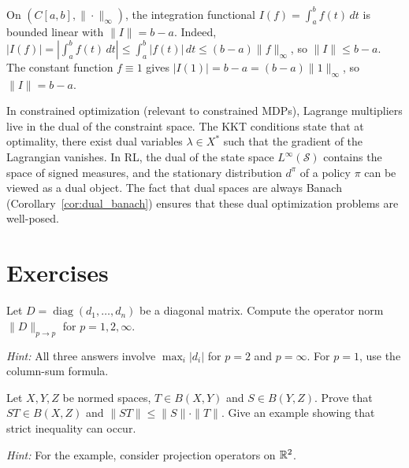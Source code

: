 \documentclass[11pt,a4paper]{article}
\begin{document}
\begin{example}
\label{ex:integration_functional}
On $(C[a,b], \|\cdot\|_\infty)$, the integration functional
$I(f) = \int_a^b f(t)\, dt$ is bounded linear with
$\|I\| = b - a$. Indeed,
$|I(f)| = |\int_a^b f(t)\, dt| \le \int_a^b |f(t)|\, dt \le (b-a)
\|f\|_\infty$, so $\|I\| \le b-a$. The constant function $f \equiv 1$
gives $|I(1)| = b - a = (b-a) \|1\|_\infty$, so $\|I\| = b - a$.
\end{example}

\begin{rlconnection}[title={Dual Spaces in Optimization and RL}]
In constrained optimization (relevant to constrained MDPs), Lagrange
multipliers live in the dual of the constraint space. The KKT conditions
state that at optimality, there exist dual variables $\lambda \in X^*$ such
that the gradient of the Lagrangian vanishes. In RL,
the dual of the state space $L^\infty(\mathcal{S})$ contains the space of
signed measures, and the stationary distribution $d^\pi$ of a policy $\pi$
can be viewed as a dual object. The fact that dual spaces are always Banach
(Corollary~\ref{cor:dual_banach}) ensures that these dual optimization
problems are well-posed.
\end{rlconnection}


\section{Exercises}
\label{sec:exercises}

\begin{exercise}
\label{ex:diag_op}
Let $D = \operatorname{diag}(d_1, \ldots, d_n)$ be a diagonal matrix.
Compute the operator norm $\|D\|_{p \to p}$ for $p = 1, 2, \infty$.

\emph{Hint:} All three answers involve $\max_i |d_i|$ for $p = 2$ and
$p = \infty$. For $p = 1$, use the column-sum formula.
\end{exercise}

\begin{exercise}
\label{ex:composition}
Let $X, Y, Z$ be normed spaces, $T \in B(X,Y)$ and $S \in B(Y,Z)$. Prove
that $ST \in B(X,Z)$ and $\|ST\| \le \|S\| \cdot \|T\|$. Give an example
showing that strict inequality can occur.

\emph{Hint:} For the example, consider projection operators on $\mathbb{R}^2$.
\end{exercise}
\end{document}
